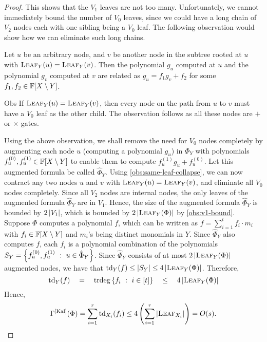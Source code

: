\begin{proof}
  This shows that the $V_1$ leaves are not too many. 
Unfortunately, we
  cannot immediately bound the number of $V_0$ leaves, since we could
  have a long chain of $V_2$ nodes each with one sibling being a $V_0$
  leaf. 
The following observation would show how we can eliminate such
  long chains.

  \begin{observation}\label{obs:same-leaf-collapse}
    Let $u$ be an arbitrary node, and $v$ be another node in the
    subtree rooted at $u$ with $\textsc{Leaf}_Y(u) =
    \textsc{Leaf}_Y(v)$. 
Then the polynomial $g_u$ computed at $u$ and
    the polynomial $g_v$ computed at $v$ are related as $g_u = f_1 g_v
    + f_2$ for some $f_1,f_2 \in \mathbb{F}[X\setminus Y]$.
  \end{observation}
  \begin{myproof}{Obs}
    If $\textsc{Leaf}_Y(u) =\textsc{Leaf}_Y(v)$, then every node on
    the path from $u$ to $v$ must have a $V_0$ leaf as the other child. 
The
    observation follows as all these nodes are $+$ or $\times$ gates.
  \end{myproof}

  Using the above observation, we shall remove the need for $V_0$
  nodes completely by augmenting each node $u$ (computing a polynomial
  $g_u$) in $\Phi_Y$ with polynomials $f_u^{(0)}, f_u^{(1)} \in \mathbb{F}[X\setminus Y]$
  to enable them to compute $f_u^{(1)}g_u + f_u^{(0)}$. 
Let this augmented formula be called $\hat{\Phi}_Y$. 
Using
  \autoref{obs:same-leaf-collapse}, we can now contract any
  two nodes $u$ and $v$ with $\textsc{Leaf}_Y(u) =
  \textsc{Leaf}_Y(v)$, and eliminate all $V_0$ nodes
  completely. 
Since all $V_2$ nodes are internal nodes, the only leaves of the augmented formula $\hat{\Phi}_Y$ are in $V_1$. 
Hence, the size of the augmented formula $\hat{\Phi}_Y$ is  bounded by $2\left|V_1\right|$, which is bounded by
  $2\left|\textsc{Leaf}_Y(\Phi)\right|$ by \autoref{obs:v1-bound}.\\

  Suppose $\Phi$ computes a polynomial $f$, which can be written as  $f
  = \sum_{i=1}^t f_i\cdot m_i$ with $f_i \in \mathbb{F}[X\setminus Y]$ and $m_i$'s being
  distinct monomials in $Y$. 
Since $\hat{\Phi}_Y$ also computes $f$, each $f_i$ is a polynomial
  combination of the polynomials $S_Y = \left\{{f_{u}^{(0)},
    f_{u}^{(1)}}\ : \ {u\in \hat{\Phi}_Y}\right\}$. 
Since $\hat{\Phi}_Y$ consists of at
  most $2\left|\textsc{Leaf}_Y(\Phi)\right|$ augmented nodes, we have that
  $\mathrm{td}_Y(f) \leq |S_Y| \leq 4\left|\textsc{Leaf}_Y(\Phi)\right|$. 
Therefore, 
  $$
  \mathrm{td}_Y(f) \quad=\quad \mathrm{trdeg}\left\{{f_i}\ : \ {i\in [t]}\right\} \quad\leq\quad 4\left|\textsc{Leaf}_Y(\Phi)\right|
  $$
  Hence, 
  $$\Gamma^{\mathrm{[Kal]}}(\Phi) = \sum_{i=1}^r \mathrm{td}_{X_i}(f_i) \leq 4\left(\sum_{i=1}^r \left|\textsc{Leaf}_{X_i}\right|\right) = O(s).
  $$
\end{proof}

